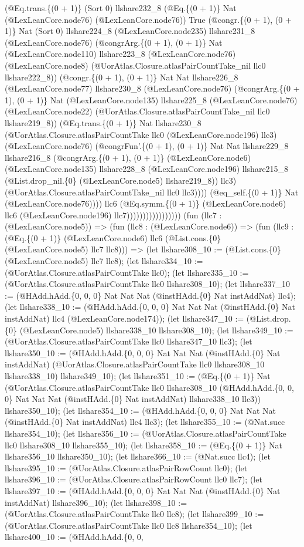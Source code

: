 \documentclass[11pt]{article}
\begin{document}
(@Eq.trans.\{(0 + 1)\} (Sort 0) llshare232\_8 (@Eq.\{(0 + 1)\} Nat (@LexLeanCore.node76) (@LexLeanCore.node76)) True (@congr.\{(0 + 1), (0 + 1)\} Nat (Sort 0) llshare224\_8 (@LexLeanCore.node235) llshare231\_8 (@LexLeanCore.node76) (@congrArg.\{(0 + 1), (0 + 1)\} Nat (@LexLeanCore.node110) llshare223\_8 (@LexLeanCore.node76) (@LexLeanCore.node8) (@UorAtlas.Closure.atlasPairCountTake\_nil llc0 llshare222\_8)) (@congr.\{(0 + 1), (0 + 1)\} Nat Nat llshare226\_8 (@LexLeanCore.node77) llshare230\_8 (@LexLeanCore.node76) (@congrArg.\{(0 + 1), (0 + 1)\} Nat (@LexLeanCore.node135) llshare225\_8 (@LexLeanCore.node76) (@LexLeanCore.node22) (@UorAtlas.Closure.atlasPairCountTake\_nil llc0 llshare219\_8)) (@Eq.trans.\{(0 + 1)\} Nat llshare230\_8 (@UorAtlas.Closure.atlasPairCountTake llc0 (@LexLeanCore.node196) llc3) (@LexLeanCore.node76) (@congrFun'.\{(0 + 1), (0 + 1)\} Nat Nat llshare229\_8 llshare216\_8 (@congrArg.\{(0 + 1), (0 + 1)\} (@LexLeanCore.node6) (@LexLeanCore.node135) llshare228\_8 (@LexLeanCore.node196) llshare215\_8 (@List.drop\_nil.\{0\} (@LexLeanCore.node5) llshare219\_8)) llc3) (@UorAtlas.Closure.atlasPairCountTake\_nil llc0 llc3)))) (@eq\_self.\{(0 + 1)\} Nat (@LexLeanCore.node76)))) llc6 (@Eq.symm.\{(0 + 1)\} (@LexLeanCore.node6) llc6 (@LexLeanCore.node196) llc7))))))))))))))))) (fun (llc7 : (@LexLeanCore.node5)) => (fun (llc8 : (@LexLeanCore.node6)) => (fun (llc9 : (@Eq.\{(0 + 1)\} (@LexLeanCore.node6) llc6 (@List.cons.\{0\} (@LexLeanCore.node5) llc7 llc8))) => (let llshare308\_10 := (@List.cons.\{0\} (@LexLeanCore.node5) llc7 llc8); (let llshare334\_10 := (@UorAtlas.Closure.atlasPairCountTake llc0); (let llshare335\_10 := (@UorAtlas.Closure.atlasPairCountTake llc0 llshare308\_10); (let llshare337\_10 := (@HAdd.hAdd.\{0, 0, 0\} Nat Nat Nat (@instHAdd.\{0\} Nat instAddNat) llc4); (let llshare338\_10 := (@HAdd.hAdd.\{0, 0, 0\} Nat Nat Nat (@instHAdd.\{0\} Nat instAddNat) llc4 (@LexLeanCore.node174)); (let llshare347\_10 := (@List.drop.\{0\} (@LexLeanCore.node5) llshare338\_10 llshare308\_10); (let llshare349\_10 := (@UorAtlas.Closure.atlasPairCountTake llc0 llshare347\_10 llc3); (let llshare350\_10 := (@HAdd.hAdd.\{0, 0, 0\} Nat Nat Nat (@instHAdd.\{0\} Nat instAddNat) (@UorAtlas.Closure.atlasPairCountTake llc0 llshare308\_10 llshare338\_10) llshare349\_10); (let llshare351\_10 := (@Eq.\{(0 + 1)\} Nat (@UorAtlas.Closure.atlasPairCountTake llc0 llshare308\_10 (@HAdd.hAdd.\{0, 0, 0\} Nat Nat Nat (@instHAdd.\{0\} Nat instAddNat) llshare338\_10 llc3)) llshare350\_10); (let llshare354\_10 := (@HAdd.hAdd.\{0, 0, 0\} Nat Nat Nat (@instHAdd.\{0\} Nat instAddNat) llc4 llc3); (let llshare355\_10 := (@Nat.succ llshare354\_10); (let llshare356\_10 := (@UorAtlas.Closure.atlasPairCountTake llc0 llshare308\_10 llshare355\_10); (let llshare358\_10 := (@Eq.\{(0 + 1)\} Nat llshare356\_10 llshare350\_10); (let llshare366\_10 := (@Nat.succ llc4); (let llshare395\_10 := (@UorAtlas.Closure.atlasPairRowCount llc0); (let llshare396\_10 := (@UorAtlas.Closure.atlasPairRowCount llc0 llc7); (let llshare397\_10 := (@HAdd.hAdd.\{0, 0, 0\} Nat Nat Nat (@instHAdd.\{0\} Nat instAddNat) llshare396\_10); (let llshare398\_10 := (@UorAtlas.Closure.atlasPairCountTake llc0 llc8); (let llshare399\_10 := (@UorAtlas.Closure.atlasPairCountTake llc0 llc8 llshare354\_10); (let llshare400\_10 := (@HAdd.hAdd.\{0, 0, 
\end{document}
